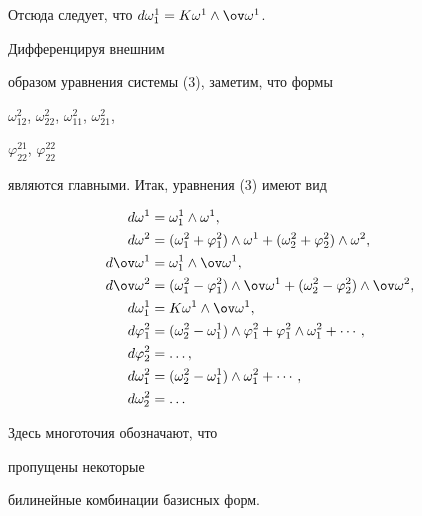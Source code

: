 Отсюда следует, что $d\omega^1_1=K\omega^1\wedge\ov\omega^1$. 


Дифференцируя внешним 


образом уравнения системы (3), заметим, что формы 


$\omega^2_{12}$, $\omega^2_{22}$, $\omega^2_{11}$, $\omega^2_{21}$, 


$\varphi^{21}_{22}$, $\varphi^{22}_{22}$ 


являются главными. Итак, уравнения (3) имеют вид 


\begin{equation} 


\begin{split} 


d\omega^1&=\omega^1_1\wedge\omega^1, \\ 


d\omega^2&=(\omega^2_1+\varphi^2_1)\wedge\omega^1+ 


(\omega^2_2+\varphi^2_2)\wedge\omega^2, \\ 


d\ov\omega^1&=\omega^1_1\wedge\ov\omega^1, \\ 


d\ov\omega^2&=(\omega^2_1-\varphi^2_1)\wedge\ov\omega^1+ 


(\omega^2_2-\varphi^2_2)\wedge\ov\omega^2, \\ 


d\omega^1_1&=K\omega^1\wedge\ov\omega^1, \\ 


d\varphi^2_1&=(\omega^2_2-\omega^1_1)\wedge\varphi^2_1+ 


\varphi^2_1\wedge\omega^2_1+\dotsb, \\ 


d\varphi^2_2&=\dotsc, \\ 


d\omega^2_1&=(\omega^2_2-\omega^1_1)\wedge\omega^2_1+\dotsb, \\ 


d\omega^2_2&=\dotsc 


\end{split} 


\end{equation} 


Здесь многоточия обозначают, что 


пропущены некоторые 


билинейные комбинации базисных форм. 


\medskip 


